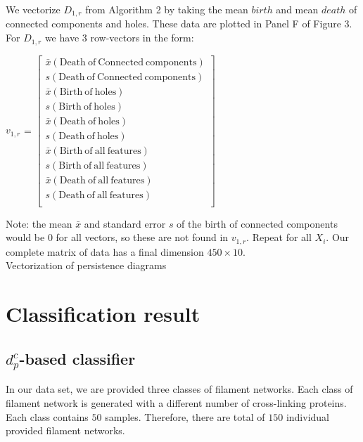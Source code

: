 \documentclass[10pt]{article}
\begin{document}
\begin{algorithm}[!htbp]
	We vectorize $D_{1,r}$ from Algorithm 2 by taking the mean $birth$ and mean $death$ of connected components and holes. These data are plotted in Panel F of Figure 3. For $D_{1,r}$ we have 3 row-vectors in the form:
	\begin{center}
	    $v_{1,r}$ =
        $\begin{bmatrix}
            \bar{x}(\mathrm{Death~of~Connected~components})\\
            s(\mathrm{Death~of~Connected~components})\\
            \bar{x}(\mathrm{Birth~of~holes})\\
            s(\mathrm{Birth~of~holes})\\
            \bar{x}(\mathrm{Death~of~holes})\\
            s(\mathrm{Death~of~holes})\\
            \bar{x}(\mathrm{Birth~of~all~features})\\
            s(\mathrm{Birth~of~all~features})\\
            \bar{x}(\mathrm{Death~of~all~features})\\
            s(\mathrm{Death~of~all~features})\\
        \end{bmatrix}$
    \end{center}
	Note: the mean $\bar{x}$ and standard error $s$ of the birth of connected components would be $0$ for all vectors, so these are not found in $v_{1,r}$. Repeat for all $X_i$. Our complete matrix of data has a final dimension $450\times10$.\\
	\caption{Vectorization of persistence diagrams}
	\label{alg:vectorization}
\end{algorithm}

\section{Classification result}

\subsection{$d^c_p$-based classifier}
In our data set, we are provided three classes of filament networks. Each class of filament network is generated with a different number of cross-linking proteins. Each class contains $50$ samples. Therefore, there are total of $150$ individual provided filament networks. 
\end{document}
